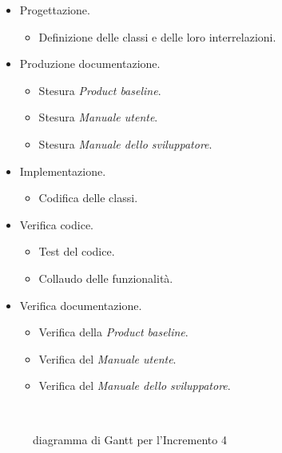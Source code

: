 \documentclass[../piano-di-progetto.tex]{subfiles}
\begin{document}
\begin{itemize}
  \item Progettazione.
  \begin{itemize}
    \item Definizione delle classi e delle loro interrelazioni.
  \end{itemize}
  \item Produzione documentazione.
  \begin{itemize}
    \item Stesura \textit{Product baseline}.
    \item Stesura \textit{Manuale utente}.
    \item Stesura \textit{Manuale dello sviluppatore}.
  \end{itemize}
  \item Implementazione.
  \begin{itemize}
    \item Codifica delle classi.
  \end{itemize}
  \item Verifica codice.
  \begin{itemize}
    \item Test del codice.
    \item Collaudo delle funzionalità.
  \end{itemize}
  \item Verifica documentazione.
  \begin{itemize}
    \item Verifica della \textit{Product baseline}.
    \item Verifica del \textit{Manuale utente}.
    \item Verifica del \textit{Manuale dello sviluppatore}.
  \end{itemize}
\end{itemize}
\begin{figure}[H]
  \centering
  
  \caption{diagramma di Gantt per l'Incremento 4}%
~~\label{fig:gantt_incremento_4}
\end{figure}
\end{document}
